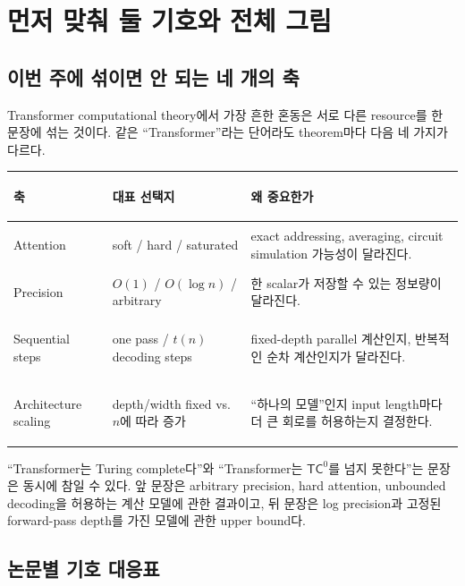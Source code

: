 \documentclass[11pt,a4paper,oneside,openany]{memoir}
\theoremstyle{definition}
\newcommand{\TC}{\mathsf{TC}}
\begin{document}
\tableofcontents*
\clearpage

\chapter{먼저 맞춰 둘 기호와 전체 그림}

\section{이번 주에 섞이면 안 되는 네 개의 축}

Transformer computational theory에서 가장 흔한 혼동은 서로 다른 resource를 한 문장에 섞는 것이다.
같은 ``Transformer''라는 단어라도 theorem마다 다음 네 가지가 다르다.

\begin{center}
\small
\begin{tabularx}{\textwidth}{>{\bfseries\raggedright\arraybackslash}p{}Y Y}
\toprule
축 & 대표 선택지 & 왜 중요한가 \\
\midrule
Attention & soft / hard / saturated & exact addressing, averaging, circuit simulation 가능성이 달라진다. \\
Precision & $O(1)$ / $O(\log n)$ / arbitrary & 한 scalar가 저장할 수 있는 정보량이 달라진다. \\
Sequential steps & one pass / $t(n)$ decoding steps & fixed-depth parallel 계산인지, 반복적인 순차 계산인지가 달라진다. \\
Architecture scaling & depth/width fixed vs.\ $n$에 따라 증가 & ``하나의 모델''인지 input length마다 더 큰 회로를 허용하는지 결정한다. \\
\bottomrule
\end{tabularx}
\end{center}

\begin{keybox}
``Transformer는 Turing complete다''와 ``Transformer는 $\TC^0$를 넘지 못한다''는 문장은 동시에 참일 수 있다.
앞 문장은 arbitrary precision, hard attention, unbounded decoding을 허용하는 계산 모델에 관한 결과이고,
뒤 문장은 log precision과 고정된 forward-pass depth를 가진 모델에 관한 upper bound다.
\end{keybox}

\section{논문별 기호 대응표}
\end{document}
